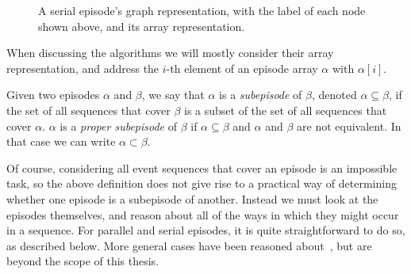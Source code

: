 \begin{figure}[h]
\centering


\caption{A serial episode's graph representation, with the label of each node shown above, and its array representation.}
\label{fig:serial-representation}
\end{figure}

When discussing the algorithms we will mostly consider their array representation, and address the $ i $-th element of an episode array $ \alpha $ with $ \alpha [i] $.

\begin{definition}
Given two episodes $ \alpha $ and $ \beta $, we say that $ \alpha $ is a \emph{subepisode} of $ \beta $, denoted $ \alpha \subseteq \beta $, if the set of all sequences that cover $ \beta $ is a subset of the set of all sequences that cover $ \alpha $. $ \alpha $ is a \emph{proper subepisode} of $ \beta $ if $ \alpha \subseteq \beta $ and $ \alpha $ and $ \beta $ are not equivalent. In that case we can write $ \alpha \subset \beta $.
\end{definition}

Of course, considering all event sequences that cover an episode is an impossible task, so the above definition does not give rise to a practical way of determining whether one episode is a subepisode of another. Instead we must look at the episodes themselves, and reason about all of the ways in which they might occur in a sequence. For parallel and serial episodes, it is quite straightforward to do so, as described below. More general cases have been reasoned about~\cite{tatti12}, but are beyond the scope of this thesis.

